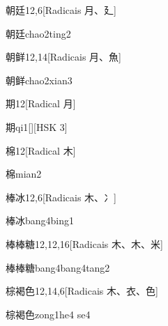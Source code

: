 \begin{entry}{朝廷}{12,6}[Radicais ⽉、⼵]
  \begin{phonetics}{朝廷}{chao2ting2}
  \end{phonetics}
\end{entry}

\begin{entry}{朝鲜}{12,14}[Radicais ⽉、⿂]
  \begin{phonetics}{朝鲜}{chao2xian3}
  \end{phonetics}
\end{entry}

\begin{entry}{期}{12}[Radical ⽉]
  \begin{phonetics}{期}{qi1}[][HSK 3]
  \end{phonetics}
\end{entry}

\begin{entry}{棉}{12}[Radical ⽊]
  \begin{phonetics}{棉}{mian2}
  \end{phonetics}
\end{entry}

\begin{entry}{棒冰}{12,6}[Radicais ⽊、⼎]
  \begin{phonetics}{棒冰}{bang4bing1}
  \end{phonetics}
\end{entry}

\begin{entry}{棒棒糖}{12,12,16}[Radicais ⽊、⽊、⽶]
  \begin{phonetics}{棒棒糖}{bang4bang4tang2}
  \end{phonetics}
\end{entry}

\begin{entry}{棕褐色}{12,14,6}[Radicais ⽊、⾐、⾊]
  \begin{phonetics}{棕褐色}{zong1he4 se4}
  \end{phonetics}
\end{entry}

